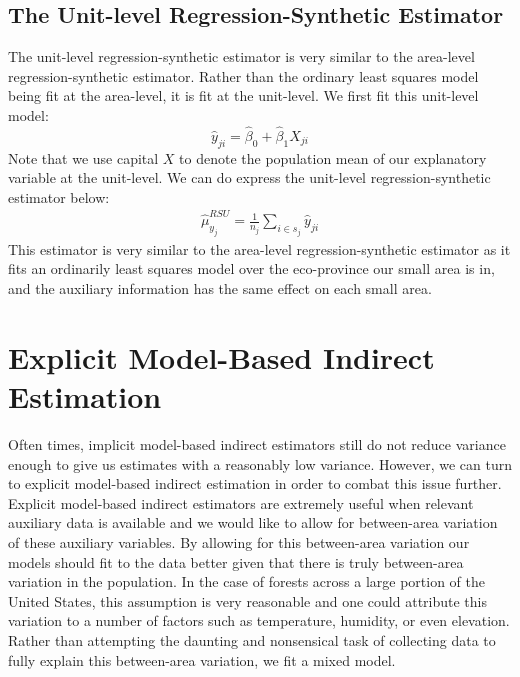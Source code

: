 \documentclass[12pt,twoside]{reedthesis}
\begin{document}
\hypertarget{the-unit-level-regression-synthetic-estimator}{%
\subsection{The Unit-level Regression-Synthetic Estimator}\label{the-unit-level-regression-synthetic-estimator}}

The unit-level regression-synthetic estimator is very similar to the area-level regression-synthetic estimator. Rather than the ordinary least squares model being fit at the area-level, it is fit at the unit-level. We first fit this unit-level model:
\[
\hat y_{ji} = \hat\beta_0 + \hat\beta_1 X_{ji}
\]
Note that we use capital \(X\) to denote the population mean of our explanatory variable at the unit-level. We can do express the unit-level regression-synthetic estimator below:
\begin{align}
\hat\mu_{y_j}^{RSU} = \frac{1}{n_j} \sum_{i \in s_j} \hat y_{ji}
\end{align}
This estimator is very similar to the area-level regression-synthetic estimator as it fits an ordinarily least squares model over the eco-province our small area is in, and the auxiliary information has the same effect on each small area.

\hypertarget{explicit-model-based-indirect-estimation}{%
\section{Explicit Model-Based Indirect Estimation}\label{explicit-model-based-indirect-estimation}}

Often times, implicit model-based indirect estimators still do not reduce variance enough to give us estimates with a reasonably low variance. However, we can turn to explicit model-based indirect estimation in order to combat this issue further. Explicit model-based indirect estimators are extremely useful when relevant auxiliary data is available and we would like to allow for between-area variation of these auxiliary variables. By allowing for this between-area variation our models should fit to the data better given that there is truly between-area variation in the population. In the case of forests across a large portion of the United States, this assumption is very reasonable and one could attribute this variation to a number of factors such as temperature, humidity, or even elevation. Rather than attempting the daunting and nonsensical task of collecting data to fully explain this between-area variation, we fit a mixed model.
\end{document}
